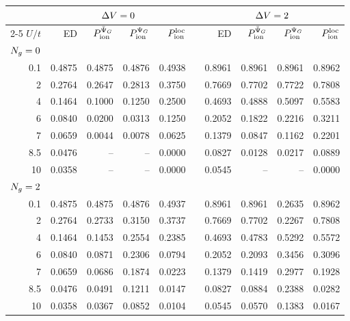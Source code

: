 \begin{tabular}{r rrrr c rrrr}
\toprule
 & \multicolumn{4}{c}{$\Delta V=0$} & & \multicolumn{4}{c}{$\Delta V=2$}\\
\cmidrule{2-5}\cmidrule{7-10}
$U/t$ & ED & $P_{\rm ion}^{\bar\Psi_G}$ & $P_{\rm ion}^{\Psi_G}$ & $P_{\rm ion}^{\rm loc}$ &  & ED & $P_{\rm ion}^{\bar\Psi_G}$ & $P_{\rm ion}^{\Psi_G}$ & $P_{\rm ion}^{\rm loc}$\\
\midrule
\multicolumn{10}{l}{$N_{g}=0$}\\
0.1 & 0.4875 & 0.4875 & 0.4876 & 0.4938 &  & 0.8961 & 0.8961 & 0.8961 & 0.8962\\
2 & 0.2764 & 0.2647 & 0.2813 & 0.3750 &  & 0.7669 & 0.7702 & 0.7722 & 0.7808\\
4 & 0.1464 & 0.1000 & 0.1250 & 0.2500 &  & 0.4693 & 0.4888 & 0.5097 & 0.5583\\
6 & 0.0840 & 0.0200 & 0.0313 & 0.1250 &  & 0.2052 & 0.1822 & 0.2216 & 0.3211\\
7 & 0.0659 & 0.0044 & 0.0078 & 0.0625 &  & 0.1379 & 0.0847 & 0.1162 & 0.2201\\
8.5 & 0.0476 & -- & -- & 0.0000 &  & 0.0827 & 0.0128 & 0.0217 & 0.0889\\
10 & 0.0358 & -- & -- & 0.0000 &  & 0.0545 & -- & -- & 0.0000\\
\midrule
\multicolumn{10}{l}{$N_{g}=2$}\\
0.1 & 0.4875 & 0.4875 & 0.4876 & 0.4937 &  & 0.8961 & 0.8961 & 0.2635 & 0.8962\\
2 & 0.2764 & 0.2733 & 0.3150 & 0.3737 &  & 0.7669 & 0.7702 & 0.2267 & 0.7808\\
4 & 0.1464 & 0.1453 & 0.2554 & 0.2385 &  & 0.4693 & 0.4783 & 0.5292 & 0.5572\\
6 & 0.0840 & 0.0871 & 0.2306 & 0.0794 &  & 0.2052 & 0.2093 & 0.3456 & 0.3096\\
7 & 0.0659 & 0.0686 & 0.1874 & 0.0223 &  & 0.1379 & 0.1419 & 0.2977 & 0.1928\\
8.5 & 0.0476 & 0.0491 & 0.1211 & 0.0147 &  & 0.0827 & 0.0884 & 0.2388 & 0.0282\\
10 & 0.0358 & 0.0367 & 0.0852 & 0.0104 &  & 0.0545 & 0.0570 & 0.1383 & 0.0167\\
\bottomrule
\end{tabular}
